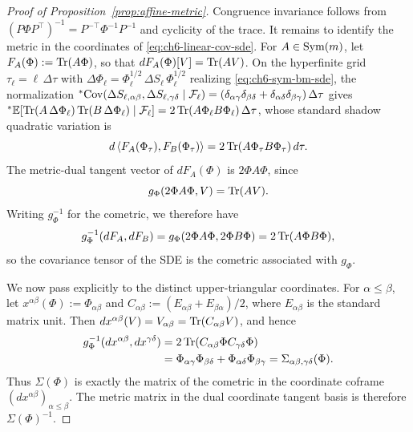 \begin{proof}[Proof of Proposition~\ref{prop:affine-metric}]
Congruence invariance follows from $(P\Phi P^\top)^{-1} = P^{-\top}\Phi^{-1}P^{-1}$ and cyclicity of the trace. It remains to identify the metric in the coordinates of \eqref{eq:ch6-linear-cov-sde}. For $A \in \operatorname{Sym}(m)$, let $F_A(\Phi) := \operatorname{Tr}(A\Phi)$, so that $dF_A(\Phi)[V] = \operatorname{Tr}(AV)$. On the hyperfinite grid $\tau_\ell = \ell\,\Delta\tau$ with $\Delta\Phi_\ell = \Phi_\ell^{1/2}\,\Delta S_\ell\,\Phi_\ell^{1/2}$ realizing \eqref{eq:ch6-sym-bm-sde}, the normalization ${}^*\!\operatorname{Cov}(\Delta S_{\ell,\alpha\beta}, \Delta S_{\ell,\gamma\delta} \mid \mathcal{F}_\ell) = (\delta_{\alpha\gamma}\delta_{\beta\delta} + \delta_{\alpha\delta}\delta_{\beta\gamma})\,\Delta\tau$ gives ${}^*\mathbb{E}[\operatorname{Tr}(A\,\Delta\Phi_\ell)\operatorname{Tr}(B\,\Delta\Phi_\ell) \mid \mathcal{F}_\ell] = 2\operatorname{Tr}(A\Phi_\ell B\Phi_\ell)\,\Delta\tau$, whose standard shadow quadratic variation is
\begin{equation}
\label{eq:appa-FA-FB-qv}
d\left\langle F_A(\Phi_\tau), F_B(\Phi_\tau) \right\rangle = 2\operatorname{Tr}(A\Phi_\tau B\Phi_\tau)\,d\tau.
\end{equation}
The metric-dual tangent vector of $dF_A(\Phi)$ is $2\Phi A\Phi$, since
\begin{equation}
\label{eq:appa-metric-dual}
g_\Phi(2\Phi A\Phi, V) = \operatorname{Tr}(AV).
\end{equation}
Writing $g_\Phi^{-1}$ for the cometric, we therefore have
\begin{equation}
\label{eq:appa-cometric-FA-FB}
g_\Phi^{-1}(dF_A, dF_B) = g_\Phi(2\Phi A\Phi, 2\Phi B\Phi) = 2\operatorname{Tr}(A\Phi B\Phi),
\end{equation}
so the covariance tensor of the SDE is the cometric associated with $g_\Phi$.

We now pass explicitly to the distinct upper-triangular coordinates. For $\alpha \le \beta$, let $x^{\alpha\beta}(\Phi) := \Phi_{\alpha\beta}$ and $C_{\alpha\beta} := (E_{\alpha\beta} + E_{\beta\alpha})/2$, where $E_{\alpha\beta}$ is the standard matrix unit. Then $dx^{\alpha\beta}(V) = V_{\alpha\beta} = \operatorname{Tr}(C_{\alpha\beta} V)$, and hence
\begin{equation}
\label{eq:appa-cometric-coords}
\begin{aligned}
g_\Phi^{-1}(dx^{\alpha\beta}, dx^{\gamma\delta})
&= 2\operatorname{Tr}(C_{\alpha\beta}\Phi C_{\gamma\delta}\Phi) \\
&= \Phi_{\alpha\gamma}\Phi_{\beta\delta} + \Phi_{\alpha\delta}\Phi_{\beta\gamma} = \Sigma_{\alpha\beta,\gamma\delta}(\Phi).
\end{aligned}
\end{equation}
Thus $\Sigma(\Phi)$ is exactly the matrix of the cometric in the coordinate coframe $(dx^{\alpha\beta})_{\alpha \le \beta}$. The metric matrix in the dual coordinate tangent basis is therefore $\Sigma(\Phi)^{-1}$.
\end{proof}

